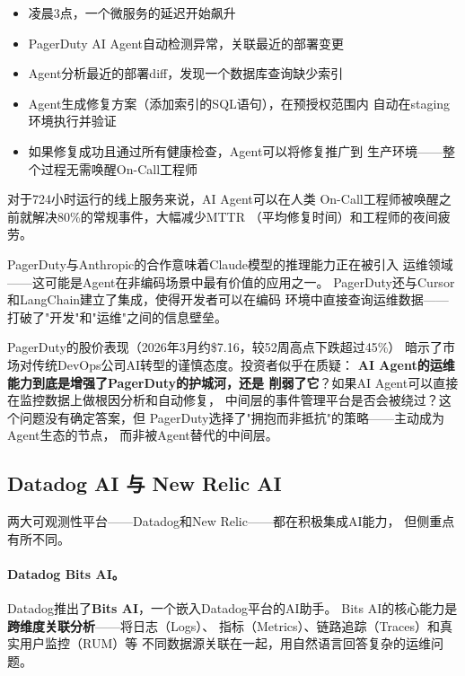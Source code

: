 \begin{itemize}
  \item 凌晨3点，一个微服务的延迟开始飙升
  \item PagerDuty AI Agent自动检测异常，关联最近的部署变更
  \item Agent分析最近的部署diff，发现一个数据库查询缺少索引
  \item Agent生成修复方案（添加索引的SQL语句），在预授权范围内
    自动在staging环境执行并验证
  \item 如果修复成功且通过所有健康检查，Agent可以将修复推广到
    生产环境——整个过程无需唤醒On-Call工程师
\end{itemize}

对于7\texttimes 24小时运行的线上服务来说，AI Agent可以在人类
On-Call工程师被唤醒之前就解决80\%的常规事件，大幅减少MTTR
（平均修复时间）和工程师的夜间疲劳。

PagerDuty与Anthropic的合作意味着Claude模型的推理能力正在被引入
运维领域——这可能是Agent在非编码场景中最有价值的应用之一。
PagerDuty还与Cursor和LangChain建立了集成，使得开发者可以在编码
环境中直接查询运维数据——打破了"开发"和"运维"之间的信息壁垒。

PagerDuty的股价表现（2026年3月约\$7.16，较52周高点下跌超过45\%）
暗示了市场对传统DevOps公司AI转型的谨慎态度。投资者似乎在质疑：
\textbf{AI Agent的运维能力到底是增强了PagerDuty的护城河，还是
削弱了它}？如果AI Agent可以直接在监控数据上做根因分析和自动修复，
中间层的事件管理平台是否会被绕过？这个问题没有确定答案，但
PagerDuty选择了"拥抱而非抵抗"的策略——主动成为Agent生态的节点，
而非被Agent替代的中间层。

\subsection{Datadog AI 与 New Relic AI}
\label{subsec:datadog-newrelic}

两大可观测性平台——Datadog和New Relic——都在积极集成AI能力，
但侧重点有所不同。

\paragraph{Datadog Bits AI。}
Datadog推出了\textbf{Bits AI}，一个嵌入Datadog平台的AI助手。
Bits AI的核心能力是\textbf{跨维度关联分析}——将日志（Logs）、
指标（Metrics）、链路追踪（Traces）和真实用户监控（RUM）等
不同数据源关联在一起，用自然语言回答复杂的运维问题。

